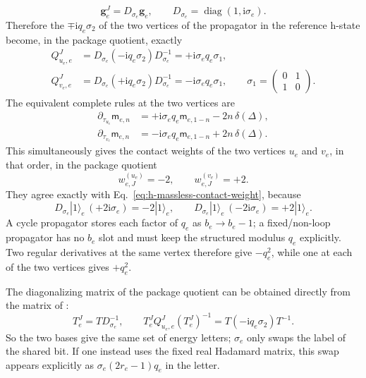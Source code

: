 \documentclass[11pt,a4paper]{article}
\newcommand{\ii}{\mathrm i}
\begin{document}
\begin{equation}
 \bm g_e^J=D_{\sigma_e}\bm g_e,
 \qquad
 D_{\sigma_e}=\operatorname{diag}(1,\ii\sigma_e).
 \label{eq:h-to-package-basis}
\end{equation}
Therefore the $\mp\ii q_e\sigma_2$ of the two vertices of the propagator in the reference h-state become, in the package quotient, exactly
\begin{align}
 Q^J_{u_e,e}
 &=D_{\sigma_e}(-\ii q_e\sigma_2)D_{\sigma_e}^{-1}
   =+\ii\sigma_eq_e\sigma_1,\\
 Q^J_{v_e,e}
 &=D_{\sigma_e}(+\ii q_e\sigma_2)D_{\sigma_e}^{-1}
   =-\ii\sigma_eq_e\sigma_1,
 \qquad
 \sigma_1=\begin{pmatrix}0&1\\1&0\end{pmatrix}.
 \label{eq:package-endpoint-generators}
\end{align}
The equivalent complete rules at the two vertices are
\begin{align}
 \partial_{\tau_{u_e}}\mathsf m_{e,n}
 &=+\ii\sigma_eq_e\mathsf m_{e,1-n}-2n\,\delta(\Delta),\\
 \partial_{\tau_{v_e}}\mathsf m_{e,n}
 &=-\ii\sigma_eq_e\mathsf m_{e,1-n}+2n\,\delta(\Delta).
 \label{eq:package-massless-time-rules}
\end{align}
This simultaneously gives the contact weights of the two vertices $u_e$ and $v_e$, in that order, in the package quotient
\begin{equation}
 w_{e,J}^{(u_e)}=-2,
 \qquad
 w_{e,J}^{(v_e)}=+2.
 \label{eq:package-massless-contact-weight}
\end{equation}
They agree exactly with Eq.~\eqref{eq:h-massless-contact-weight}, because
\begin{equation}
 D_{\sigma_e}|1\rangle_e\,(+2\ii\sigma_e)=-2|1\rangle_e,
 \qquad
 D_{\sigma_e}|1\rangle_e\,(-2\ii\sigma_e)=+2|1\rangle_e.
 \label{eq:contact-basis-conversion}
\end{equation}
A cycle propagator stores each factor of $q_e$ as $b_e\to b_e-1$; a fixed/non-loop propagator has no $b_e$ slot and must keep the structured modulus $q_e$ explicitly. Two regular derivatives at the same vertex therefore give $-q_e^2$, while one at each of the two vertices gives $+q_e^2$.

The diagonalizing matrix of the package quotient can be obtained directly from the matrix of \cite{Chen:2023eic}:
\begin{equation}
 T_e^J=T D_{\sigma_e}^{-1},
 \qquad
 T_e^JQ^J_{u_e,e}(T_e^J)^{-1}
 =T(-\ii q_e\sigma_2)T^{-1}.
 \label{eq:package-diagonalizer}
\end{equation}
So the two bases give the same set of energy letters; $\sigma_e$ only swaps the label of the shared bit. If one instead uses the fixed real Hadamard matrix, this swap appears explicitly as $\sigma_e(2r_e-1)q_e$ in the letter.
\end{document}
